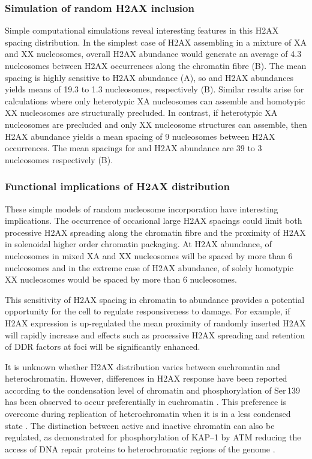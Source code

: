 \subsubsection{Simulation of random H2AX inclusion}
Simple computational simulations reveal interesting features in this H2AX spacing distribution. In
the simplest case of H2AX assembling in a mixture of XA and XX nucleosomes,  overall H2AX
abundance would generate an average of 4.3 nucleosomes between H2AX occurrences along the chromatin
fibre (B). The mean spacing is highly sensitive to H2AX abundance
(A), so  and  H2AX abundances yields means of 19.3 to 1.3
nucleosomes, respectively (B). Similar results arise for calculations
where only heterotypic XA nucleosomes can assemble and homotypic XX nucleosomes are structurally
precluded. In contrast, if heterotypic XA nucleosomes are precluded and only XX nucleosome
structures can assemble, then  H2AX abundance yields a mean spacing of 9 nucleosomes between
H2AX occurrences. The mean spacings for  and  H2AX abundance are 39 to 3 nucleosomes
respectively (B).

\subsubsection{Functional implications of H2AX distribution}
These simple models of random nucleosome incorporation have interesting implications. The occurrence
of occasional large H2AX spacings could limit both processive \textgamma H2AX spreading along the
chromatin fibre and the proximity of H2AX in solenoidal higher order chromatin packaging. At  H2AX
abundance,  of nucleosomes in mixed XA and XX nucleosomes will be spaced by more than 6 nucleosomes
and in the extreme case of  H2AX abundance,  of solely homotypic XX nucleosomes would be
spaced by more than 6 nucleosomes.

This sensitivity of H2AX spacing in chromatin to abundance provides a potential opportunity for the
cell to regulate responsiveness to damage. For example, if H2AX expression is up-regulated the mean
proximity of randomly inserted H2AX will rapidly increase and effects such as processive \textgamma H2AX
spreading and retention of DDR factors at foci will be significantly enhanced.

It is unknown whether H2AX distribution varies between euchromatin and heterochromatin. However,
differences in H2AX response have been reported according to the condensation level of chromatin and
phosphorylation of Ser\,139 has been observed to occur preferentially in euchromatin \citep{IGC+07}.
This preference is overcome during replication of heterochromatin when it is in a less condensed
state \citep{IGC+07}. The distinction between active and inactive chromatin can also be regulated, as
demonstrated for phosphorylation of KAP--1 by ATM reducing the access of DNA repair proteins to
heterochromatic regions of the genome \citep{AAG+08}.

